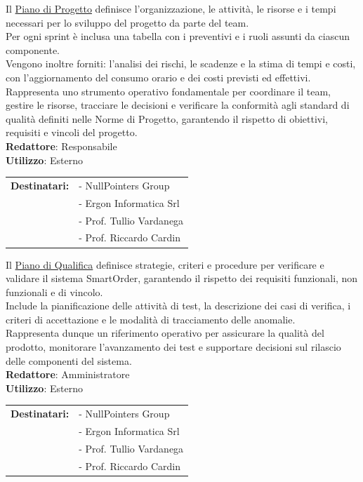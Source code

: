 	Il \href{https://nullpointersgroup.github.io/Documentazione/output/RTB/Documenti%20Esterni/Piano_di_Progetto.pdf}{Piano di Progetto} 
	definisce l’organizzazione, le attività, le risorse e i tempi necessari per lo sviluppo del progetto da parte del team. \\
	Per ogni sprint è inclusa una tabella con i preventivi e i ruoli assunti da ciascun componente. \\
	Vengono inoltre forniti: l'analisi dei rischi, le scadenze e la stima di tempi e costi, con l'aggiornamento del consumo orario e dei costi previsti ed effettivi.\\ 
	Rappresenta uno strumento operativo fondamentale per coordinare il team, gestire le risorse, tracciare le decisioni e verificare la conformità agli standard di qualità definiti nelle Norme di Progetto, garantendo il rispetto di obiettivi, requisiti e vincoli del progetto.\\[0.5em]
	\medskip
	\textbf{Redattore}: Responsabile\\
	\medskip
	\textbf{Utilizzo}: Esterno\\
	\medskip 
	\begin{tabular}{@{}l l}
		\textbf{Destinatari:} & - NullPointers Group\\
		                      & - Ergon Informatica Srl\\
		                      & - Prof. Tullio Vardanega\\
							  & - Prof. Riccardo Cardin
	\end{tabular}

	Il \href{https://nullpointersgroup.github.io/Documentazione/output/RTB/Documenti%20Esterni/Piano_di_Qualifica.pdf}{Piano di Qualifica} 
	definisce strategie, criteri e procedure per verificare e validare il sistema SmartOrder, garantendo il rispetto dei requisiti funzionali, 
	non funzionali e di vincolo.\\
	Include la pianificazione delle attività di test, la descrizione dei casi di verifica, i criteri di accettazione e le modalità di tracciamento delle anomalie.\\
	Rappresenta dunque un riferimento operativo per assicurare la qualità del prodotto, monitorare l’avanzamento dei test e supportare decisioni sul rilascio 
	delle componenti del sistema.\\[0.5em]
	\medskip
	\textbf{Redattore}: Amministratore\\
	\medskip
	\textbf{Utilizzo}: Esterno\\
	\medskip 
	\begin{tabular}{@{}l l}
		\textbf{Destinatari:} & - NullPointers Group\\
		                      & - Ergon Informatica Srl\\
		                      & - Prof. Tullio Vardanega\\
							  & - Prof. Riccardo Cardin
	\end{tabular}
	
